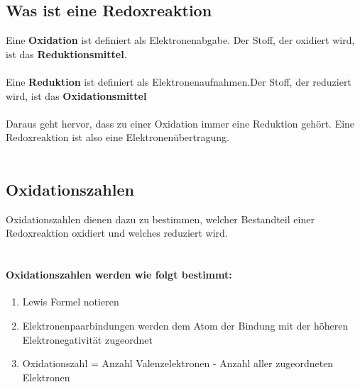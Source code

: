\documentclass[a4paper]{article}
\begin{document}
\subsection{Was ist eine Redoxreaktion}
Eine \textbf{Oxidation} ist definiert als Elektronenabgabe. Der Stoff, der oxidiert wird, ist das \textbf{Reduktionsmittel}.\\\\
Eine \textbf{Reduktion} ist definiert als Elektronenaufnahmen.Der Stoff, der reduziert wird, ist das \textbf{Oxidationsmittel}\\\\
Daraus geht hervor, dass zu einer Oxidation immer eine Reduktion gehört. Eine Redoxreaktion ist also eine Elektronenübertragung.\\\\


\subsection{Oxidationszahlen}
Oxidationszahlen dienen dazu zu bestimmen, welcher Bestandteil einer Redoxreaktion oxidiert und welches reduziert wird.\\\\

\paragraph{Oxidationszahlen werden wie folgt bestimmt:}
\begin{enumerate}
    \item Lewis Formel notieren
    \item Elektronenpaarbindungen werden dem Atom der Bindung mit der höheren Elektronegativität zugeordnet
    \item Oxidationszahl = Anzahl Valenzelektronen - Anzahl aller zugeordneten Elektronen\\\\
\end{enumerate}
\end{document}
